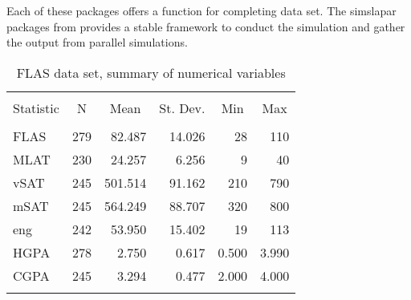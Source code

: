 Each of these packages offers a function for completing data set. The simslapar
packages from \cite{hofert2015simsalpar} provides a stable framework to conduct
the simulation and gather the output from parallel simulations.

\begin{table}[ht] \centering
  \caption{FLAS data set, summary of numerical variables}
  \label{tbl:flas:numeric}
\begin{tabular}{@{\extracolsep{5pt}}lrrrrr}
\\[-1.8ex]\hline
\hline \\[-1.8ex]
Statistic & \multicolumn{1}{c}{N} & \multicolumn{1}{c}{Mean} & \multicolumn{1}{c}{St. Dev.} & \multicolumn{1}{c}{Min} & \multicolumn{1}{c}{Max} \\
\hline \\[-1.8ex]
FLAS & 279 & 82.487 & 14.026 & 28 & 110 \\
MLAT & 230 & 24.257 & 6.256 & 9 & 40 \\
vSAT & 245 & 501.514 & 91.162 & 210 & 790 \\
mSAT & 245 & 564.249 & 88.707 & 320 & 800 \\
eng & 242 & 53.950 & 15.402 & 19 & 113 \\
HGPA & 278 & 2.750 & 0.617 & 0.500 & 3.990 \\
CGPA & 245 & 3.294 & 0.477 & 2.000 & 4.000 \\
\hline \\[-1.8ex]
\end{tabular}
\end{table}

